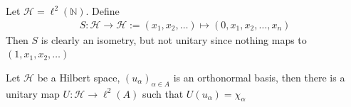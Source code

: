 \begin{example}
  Let $\mathcal{H} = \ell^{2}(\mathbb{N})$. Define
  \begin{align*}
    S : \mathcal{H} \to \mathcal{H} := (x_1 , x_2 , \ldots) \mapsto
    (0, x_1 , x_2 , \ldots , x_n)
  \end{align*}
  Then $S$ is clearly an isometry, but not unitary since nothing maps
  to $(1, x_1 , x_2 , \ldots)$
\end{example}

\begin{theorem}
  Let $\mathcal{H}$ be a Hilbert space, $(u_\alpha)_{\alpha \in A}$
  is an orthonormal basis, then there is a unitary map $U:
  \mathcal{H} \to \ell^{2}(A)$ such that $U(u_\alpha) = \chi_\alpha$
\end{theorem}
